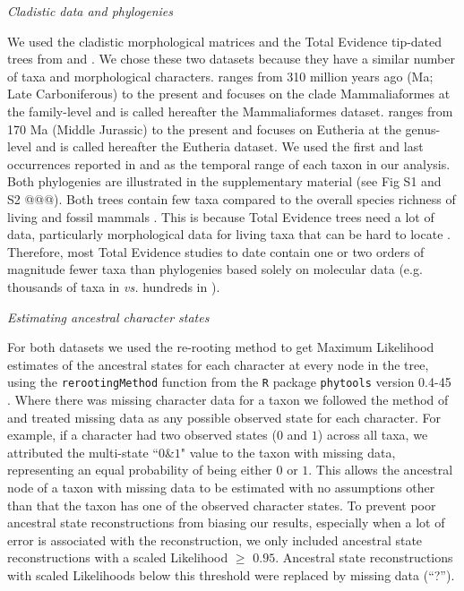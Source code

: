 \documentclass[12pt,letterpaper]{article}
\renewcommand{\subsection}[1]{%
\bigskip
\begin{center}
\begin{large}
\normalfont\itshape #1
\end{large}
\end{center}}
\begin{document}
\subsection{Cladistic data and phylogenies}
We used the cladistic morphological matrices and the Total Evidence tip-dated trees \citep{ronquista2012} from \citet[][103 taxa with 446 morphological characters;]{Slater2012MEE} and \citet[][102 taxa with 421 morphological characters]{beckancient2014}.
We chose these two datasets because they have a similar number of taxa and morphological characters.
\cite{Slater2012MEE} ranges from 310 million years ago (Ma; Late Carboniferous) to the present and focuses on the clade Mammaliaformes at the family-level and is called hereafter the Mammaliaformes dataset.
\cite{beckancient2014} ranges from 170 Ma (Middle Jurassic) to the present and focuses on Eutheria at the genus-level and is called hereafter the Eutheria dataset.
We used the first and last occurrences reported in \cite{Slater2012MEE} and \cite{beckancient2014} as the temporal range of each taxon in our analysis.
Both phylogenies are illustrated in the supplementary material (see Fig S1 and S2 @@@).
Both trees contain few taxa compared to the overall species richness of living and fossil mammals \citep{wilson2005mammal,archibald2011extinction}. %
This is because Total Evidence trees need a lot of data, particularly morphological data for living taxa that can be hard to locate \citep{MissingMammals}.
Therefore, most Total Evidence studies to date contain one or two orders of magnitude fewer taxa than phylogenies based solely on molecular data (e.g. thousands of taxa in \citealt{bininda2007delayed,meredithimpacts2011} \textit{vs.} hundreds in \citealt{ronquista2012,Slater2012MEE,Wood01032013,beckancient2014}).


\subsection{Estimating ancestral character states}
For both datasets we used the re-rooting method \citep{Yang01121995,Garland2000} to get Maximum Likelihood estimates of the ancestral states for each character at every node in the tree, using the \texttt{rerootingMethod} function from the \texttt{R} package \texttt{phytools} version 0.4-45 \citep{phytools,R}.
Where there was missing character data for a taxon we followed the method of \cite{Claddis} and treated missing data as any possible observed state for each character.
For example, if a character had two observed states ($0$ and $1$) across all taxa, we attributed the multi-state ``$0$\&$1$" value to the taxon with missing data, representing an equal probability of being either $0$ or $1$.
This allows the ancestral node of a taxon with missing data to be estimated with no assumptions other than that the taxon has one of the observed character states.
To prevent poor ancestral state reconstructions from biasing our results, especially when a lot of error is associated with the reconstruction, we only included ancestral state reconstructions with a scaled Likelihood $\geq$ $0.95$.
Ancestral state reconstructions with scaled Likelihoods below this threshold were replaced by missing data (``?'').
\end{document}
